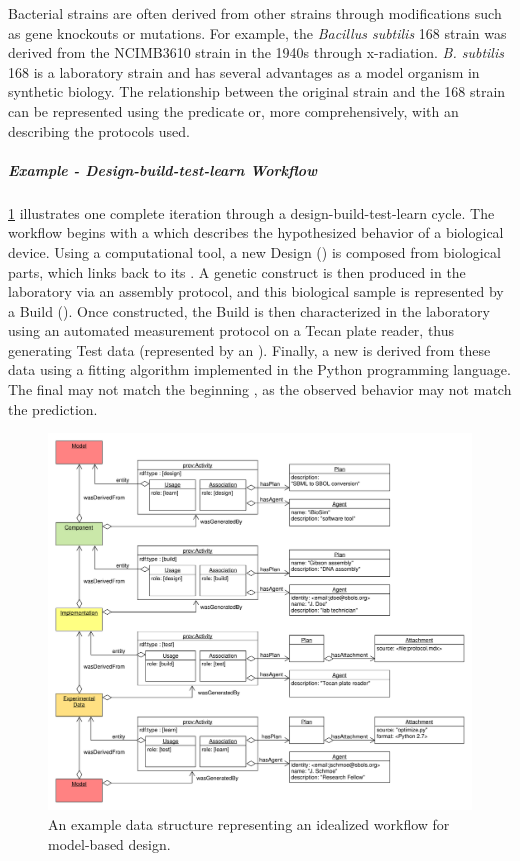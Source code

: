 Bacterial strains are often derived from other strains through modifications such as gene knockouts or mutations. For example, the \textit{Bacillus subtilis} 168 strain was derived from the NCIMB3610 strain in the 1940s through x-radiation. \textit{B. subtilis} 168 is a laboratory strain and has several advantages as a model organism in synthetic biology.
The relationship between the original strain and the 168 strain can be represented using the  predicate or, more comprehensively, with an  describing the protocols used.

\subparagraph{Example - Design-build-test-learn Workflow}

\ref{images:design-build-test-learn} illustrates one complete iteration through a design-build-test-learn cycle.
The workflow begins with a  which describes the hypothesized behavior of a biological device.
Using a computational tool, a new Design () is composed from biological parts, which links back to its . A genetic construct is then produced in the laboratory via an assembly protocol, and this biological sample is represented by a Build (). Once constructed, the Build is then characterized in the laboratory using an automated measurement protocol on a Tecan plate reader, thus generating Test data (represented by an ). Finally, a new  is derived from these data using a fitting algorithm implemented in the Python programming language. The final  may not match the beginning , as the observed behavior may not match the prediction.

\begin{figure}[ht]
\begin{center}
\includegraphics[width=0.75\linewidth]{uml/design-build-test}
\caption[]{An example data structure representing an idealized workflow for model-based design.}
\label{images:design-build-test-learn}
\end{center}
\end{figure}

